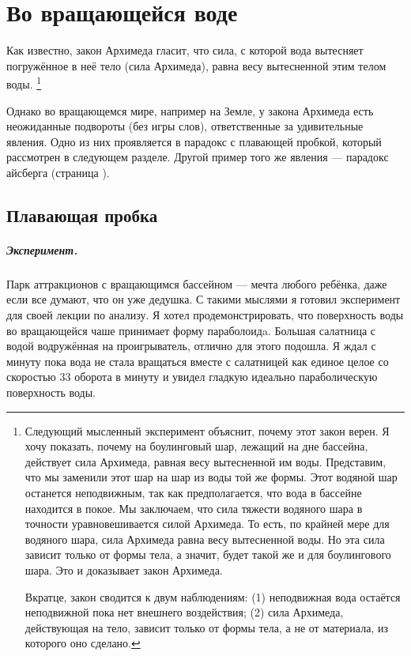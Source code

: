 \chapter{Во вращающейся воде}

Как известно, закон Архимеда гласит, что сила, с которой вода вытесняет погружённое в неё тело (сила Архимеда), равна весу вытесненной этим телом воды.%
\footnote{Следующий мысленный эксперимент объяснит, почему этот закон верен.
Я хочу показать, почему на боулинговый шар, лежащий на дне бассейна, действует сила Архимеда, равная весу вытесненной им воды.
Представим, что мы заменили этот шар на шар из воды той же формы.
Этот водяной шар останется неподвижным, так как предполагается, что вода в бассейне находится в покое.
Мы заключаем, что сила тяжести водяного шара в точности уравновешивается силой Архимеда.
То есть, по крайней мере для водяного шара, сила Архимеда равна весу вытесненной воды.
Но эта сила зависит только от формы тела, а значит, будет такой же и для боулингового шара.
Это и доказывает закон Архимеда.

Вкратце, закон сводится к двум наблюдениям:
(1) неподвижная вода остаётся неподвижной пока нет внешнего воздействия;
(2) сила Архимеда, действующая на тело, зависит только от формы тела, а не от материала, из которого оно сделано.}

Однако во вращающемся мире, например на Земле, у закона Архимеда есть неожиданные подвороты (без игры слов), ответственные за удивительные явления.
Одно из них проявляется в парадокс с плавающей пробкой, который рассмотрен в следующем разделе.
Другой пример того же явления --- парадокс айсберга (страница \pageref{sec:iceberg}).

\section{Плавающая пробка}\label{sec:cork}

\paragraph{Эксперимент.}
Парк аттракционов с вращающимся бассейном --- мечта любого ребёнка, даже если все думают, что он уже дедушка.
С такими мыслями я готовил эксперимент для своей лекции по анализу.
Я хотел продемонстрировать, что поверхность воды во вращающейся чаше принимает форму параболоидa.
Большая салатница с водой водружённая на проигрыватель, отлично для этого подошла.
Я ждал с минуту пока вода не стала вращаться вместе с салатницей как единое целое со скоростью 33 оборота в минуту и увидел гладкую идеально параболическую поверхность воды.

